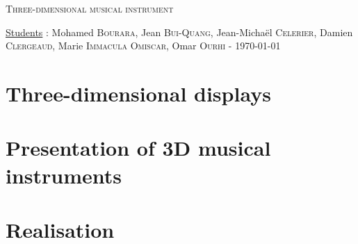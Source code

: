 \documentclass[a4paper,11pt,oneside]{report}
\begin{document}
\begin{titlepage}
  \begin{center}

    \textsc{\LARGE Three-dimensional musical instrument}\\[1cm]
    
  \end{center}
  
  \begin{flushbottom}
   \begin{flushleft}
    \underline{Students} : Mohamed \textsc{Bourara}, Jean \textsc{Bui-Quang}, Jean-Michaël \textsc{Celerier}, Damien \textsc{Clergeaud}, Marie \textsc{Immacula Omiscar}, Omar \textsc{Ourhi} - \today \\
   \end{flushleft}
  \end{flushbottom}
\end{titlepage}
\clearpage
\tableofcontents
\listoffigures




\chapter{Three-dimensional displays}
\chapter{Presentation of 3D musical instruments}



\chapter{Realisation}





\printglossaries


\end{document}
